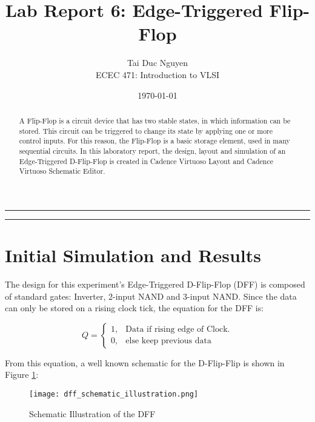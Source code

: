 \documentclass[letterpaper, 11pt]{article}
\title{Lab Report 6: Edge-Triggered Flip-Flop}
\author{
Tai Duc Nguyen \\
ECEC 471: Introduction to VLSI
}
\date{\today}
\begin{document}
\maketitle




\rule{\textwidth}{1pt}

\begin{abstract}
	A Flip-Flop is a circuit device that has two stable states, in which information can be stored. This circuit can be triggered to change its state by applying one or more control inputs. For this reason, the Flip-Flop is a basic storage element, used in many sequential circuits. In this laboratory report, the design, layout and simulation of an Edge-Triggered D-Flip-Flop is created in Cadence Virtuoso Layout and Cadence Virtuoso Schematic Editor.
\end{abstract}

\rule{\textwidth}{1pt}

\section{Initial Simulation and Results}
\label{sec:init_sim}

The design for this experiment's Edge-Triggered D-Flip-Flop (DFF) is composed of standard gates: Inverter, 2-input NAND and 3-input NAND. Since the data can only be stored on a rising clock tick, the equation for the DFF is:

\begin{equation}
Q=\begin{cases}
1, & \text{Data if rising edge of Clock}.\\
0, & \text{else keep previous data}
\end{cases}
\end{equation}

From this equation, a well known schematic for the D-Flip-Flip is shown in Figure \ref{fig1}:

\begin{figure}[htb!]
	\centering
	\texttt{[image: dff\_schematic\_illustration.png]}
	\caption{Schematic Illustration of the DFF}
	\label{fig1}
\end{figure}
\end{document}
